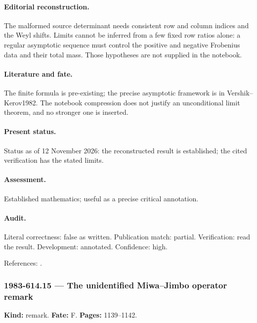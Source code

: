 \paragraph{Editorial reconstruction.} The malformed source determinant needs consistent row and column indices and the Weyl shifts. Limits cannot be inferred from a few fixed row ratios alone: a regular asymptotic sequence must control the positive and negative Frobenius data and their total mass. Those hypotheses are not supplied in the notebook.

\paragraph{Literature and fate.} The finite formula is pre-existing; the precise asymptotic framework is in Vershik--Kerov1982. The notebook compression does not justify an unconditional limit theorem, and no stronger one is inserted.

\paragraph{Present status.} Status as of 12 November 2026: the reconstructed result is established; the cited verification has the stated limits.

\paragraph{Assessment.} Established mathematics; useful as a precise critical annotation.

\paragraph{Audit.} Literal correctness: false as written. Publication match: partial. Verification: read the result. Development: annotated. Confidence: high.

\noindent References: \citep{vershikkerov1982unitary}.\par

\subsubsection{1983-614.15 --- The unidentified Miwa--Jimbo operator remark}

\label{item:1983-614.15}

\noindent\textbf{Kind:} remark. \textbf{Fate:} F. \textbf{Pages:} 1139--1142.\par

